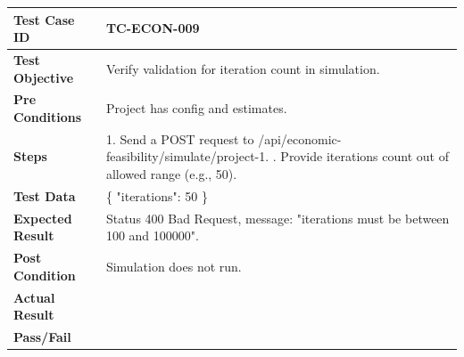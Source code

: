 \begin{longtable}{|p{}|p{}|}
\hline
\textbf{Test Case ID} & TC-ECON-009 \\ \hline
\textbf{Test Objective} & Verify validation for iteration count in simulation. \\ \hline
\textbf{Pre Conditions} & Project has config and estimates. \\ \hline
\textbf{Steps} & 
1. Send a POST request to /api/economic-feasibility/simulate/project-1. \newline
2. Provide iterations count out of allowed range (e.g., 50). \\ \hline
\textbf{Test Data} & \{ "iterations": 50 \} \\ \hline
\textbf{Expected Result} & Status 400 Bad Request, message: "iterations must be between 100 and 100000". \\ \hline
\textbf{Post Condition} & Simulation does not run. \\ \hline
\textbf{Actual Result} &  \\ \hline
\textbf{Pass/Fail} &  \\ \hline
\end{longtable}